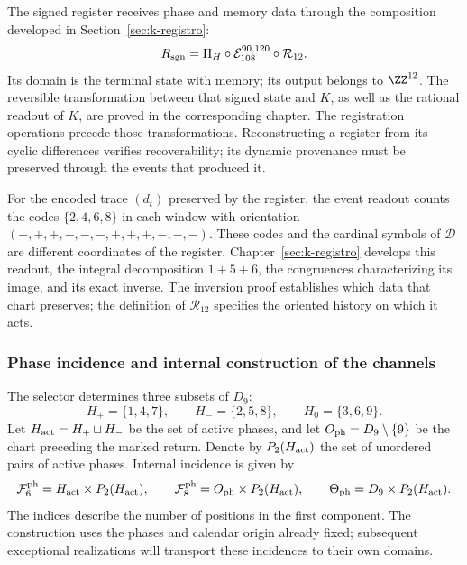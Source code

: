 The signed register receives phase and memory data through the
composition developed in Section~\ref{sec:k-registro}:
\begin{equation}
 R_{\rm sgn}=\Pi_H\circ\mathcal E_{108}^{90,120}
                         \circ\mathcal R_{12}.
 \label{tpk-int:registro-causal}
\end{equation}
Its domain is the terminal state with memory; its output belongs to
\(\ZZ^{12}\). The reversible transformation between that signed state
and \(K\), as well as the rational readout of \(K\), are proved in
the corresponding chapter. The registration operations precede
those transformations. Reconstructing a register from its
cyclic differences verifies recoverability; its dynamic provenance
must be preserved through the events that produced it.

For the encoded trace \((d_t)\) preserved by the register, the
event readout counts the codes \(\{2,4,6,8\}\) in each
window with orientation
\((+,+,+,-,-,-,+,+,+,-,-,-)\). These codes and the
cardinal symbols of \(\mathcal D\) are different coordinates of the
register. Chapter~\ref{sec:k-registro} develops this readout,
the integral decomposition \(1+5+6\), the congruences
characterizing its image, and its exact inverse. The inversion proof
establishes which data that chart preserves; the definition of
\(\mathcal R_{12}\) specifies the oriented history on which
it acts.

\subsubsection{Phase incidence and internal construction of the channels}
\label{tpk-int:incidencia}

The selector determines three subsets of \(D_9\):
\[
 H_+=\{1,4,7\},\qquad H_-=\{2,5,8\},\qquad H_0=\{3,6,9\}.
\]
Let \(H_{\rm act}=H_+\sqcup H_-\) be the set of active phases, and
let \(O_{\rm ph}=D_9\setminus\{9\}\) be the chart preceding the marked
return. Denote by \(P_2(H_{\rm act})\) the set of
unordered pairs of active phases. Internal incidence is given by
\begin{equation}
 \mathcal F^{\rm ph}_6=H_{\rm act}\times P_2(H_{\rm act}),\qquad
 \mathcal F^{\rm ph}_8=O_{\rm ph}\times P_2(H_{\rm act}),\qquad
 \Theta_{\rm ph}=D_9\times P_2(H_{\rm act}).
 \label{tpk-int:fases90120}
\end{equation}
The indices describe the number of positions in the first component.
The construction uses the phases and calendar origin already fixed;
subsequent exceptional realizations will transport these
incidences to their own domains.

